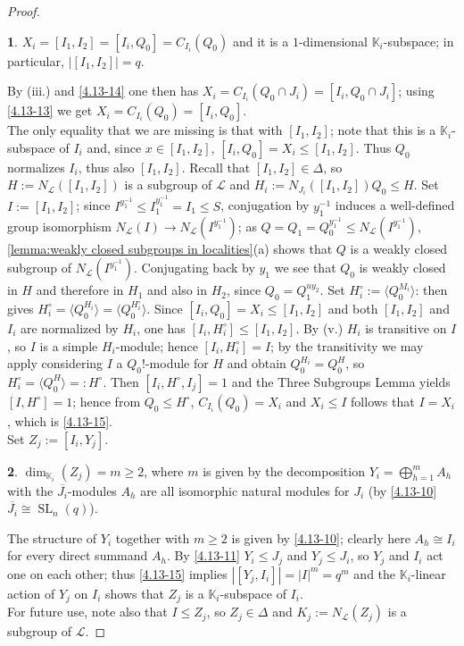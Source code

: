 \documentclass{amsart}
\numberwithin{equation}{section}
\theoremstyle{definition}
\theoremstyle{subresult}
\newtheorem{subresult}{}[equation]
\theoremstyle{caseresult}
\newcommand{\bK}{\mathbb{K}}
\renewcommand{\L}{\mathcal{L}}
\newcommand{\SL}{\operatorname{SL}}
\newcommand{\ov}{\overline}
\newcommand{\inv}{^{-1}}
\newcommand{\fto}{\longrightarrow}
\newcommand{\<}{\langle}
\renewcommand{\>}{\rangle}
\begin{document}
\begin{proof}
	\begin{subresult}\label{4.13-15}
		$X_i = [I_1,I_2] = [I_i,Q_0]=C_{I_i}(Q_0)$ and it is a $1$-dimensional $\bK_i$-subspace; in particular, $|[I_1,I_2]|=q$.
	\end{subresult}
	By (iii.) and \eqref{4.13-14} one then has $X_i = C_{I_i}(Q_0 \cap J_i) = [I_i, Q_0 \cap J_i]$; using \eqref{4.13-13} we get $X_i = C_{I_i}(Q_0) = [I_i,Q_0]$.\\
	The only equality that we are missing is that with $[I_1,I_2]$; note that this is a $\bK_i$-subspace of $I_i$ and, since $x \in [I_1,I_2]$, $[I_i,Q_0] = X_i \le [I_1,I_2]$. Thus $Q_0$ normalizes $I_i$, thus also $[I_1,I_2]$. Recall that $[I_1,I_2] \in \Delta$, so $H:=N_\L([I_1,I_2])$ is a subgroup of $\L$ and $H_i:= N_{J_i}([I_1,I_2])Q_0 \le H$. Set $I:= [I_1,I_2]$; since $I^{y_1\inv} \le I_1^{y_1\inv} = I_1 \le S$, conjugation by $y_1\inv$ induces a well-defined group isomorphism $N_\L(I) \fto N_\L(I^{y_1\inv})$; as $Q=Q_1 = Q_0^{y_1\inv} \le N_\L(I^{y_1\inv})$, \ref{lemma:weakly closed subgroups in localities}(a) shows that $Q$ is a weakly closed subgroup of $N_\L(I^{y_1\inv})$. Conjugating back by $y_1$ we see that $Q_0$ is weakly closed in $H$ and therefore in $H_1$ and also in $H_2$, since $Q_0=Q_1^{uy_2}$. Set $H_i^\circ := \< Q_0 ^{M_i} \>$: then \cite[Lemma 1.46(c)]{Meier-Stell-Stroth:2012} gives $H_i^\circ = \< Q_0 ^{H_i} \> = \< Q_0^{H_i^\circ} \>$. 
	Since $[I_i,Q_0]  = X_i \le [I_1,I_2]$ and both $[I_1,I_2]$ and $I_i$ are normalized by $H_i$, one has $[I_i, H_i^\circ] \le [I_1,I_2]$.
	By (v.) $H_i$ is transitive on $I$, so $I$ is a simple $H_i$-module; hence $[I_i,H_i^\circ] = I$; by the transitivity we may apply \cite[Lemma 1.57(c)]{Meier-Stell-Stroth:2012} considering $I$ a $Q_0!$-module for $H$ and obtain $Q_0^{H_i} = Q_0^{H}$, so $H_i^\circ = \< Q_0^H \> =: H^\circ$. Then $[I_i, H^\circ, I_j] = 1$ and the Three Subgroups Lemma yields $[I,H^\circ]=1$; hence from $Q_0 \le H^\circ$, $C_{I_i}(Q_0) = X_i$ and $X_i \le I$ follows that $I=X_i$, which is \eqref{4.13-15}.\\
	
	Set $Z_j:=[I_i,Y_j]$.
	
	\begin{subresult}\label{4.13-16}
		$\dim_{\bK_i}(Z_j) = m \ge 2$, where $m$ is given by the decomposition $Y_i=\displaystyle \bigoplus_{h=1}^m A_h$ with the $\ov{J_i}$-modules $A_h$ are all isomorphic natural modules for $J_i$ (by \eqref{4.13-10} $\ov{J_i} \cong \SL_n(q)$).
	\end{subresult}
	The structure of $Y_i$ together with $m \ge 2$ is given by \eqref{4.13-10}; clearly here $A_h \cong I_i$ for every direct summand $A_h$. By \eqref{4.13-11} $Y_i \le J_j$ and $Y_j \le J_i$, so $Y_j$ and $I_i$ act one on each other; thus \eqref{4.13-15} implies $|[Y_j,I_i]|=|I|^m = q^m$ and the $\bK_i$-linear action of $Y_j$ on $I_i$ shows that $Z_j$ is a $\bK_i$-subspace of $I_i$.\\
	For future use, note also that $I \le Z_j$, so $Z_j \in \Delta$ and $K_j:=N_\L(Z_j)$ is a subgroup of $\L$. 
	

\end{proof}
\end{document}
